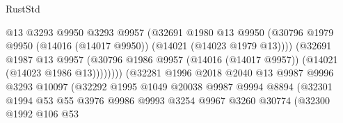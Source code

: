 \begin{lexlean}{RustStd}
\begin{coremodule}
                                          @13
                                          @3293
                                          @9950
                                          @3293
                                          @9957
                                          (@32691
                                            @1980
                                            @13
                                            @9950
                                            (@30796
                                              @1979
                                              @9950
                                              (@14016 (@14017 @9950))
                                              (@14021 (@14023 @1979 @13))))
                                          (@32691
                                            @1987
                                            @13
                                            @9957
                                            (@30796
                                              @1986
                                              @9957
                                              (@14016 (@14017 @9957))
                                              (@14021 (@14023 @1986 @13))))))))
                                  (@32281
                                    @1996
                                    @2018
                                    @2040
                                    @13
                                    @9987
                                    @9996
                                    @3293
                                    @10097
                                    (@32292
                                      @1995
                                      @1049
                                      @20038
                                      @9987
                                      @9994
                                      @8894
                                      (@32301
                                        @1994
                                        @53
                                        @55
                                        @3976
                                        @9986
                                        @9993
                                        @3254
                                        @9967
                                        @3260
                                        @30774
                                        (@32300
                                          @1992
                                          @106
                                          @53

\end{coremodule}
\end{lexlean}
